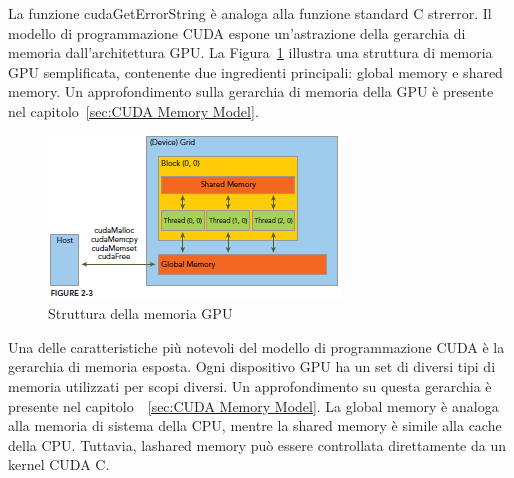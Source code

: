 La funzione cudaGetErrorString è analoga alla funzione standard C strerror.
Il modello di programmazione CUDA espone un'astrazione della gerarchia di memoria dall'architettura GPU. La Figura~\ref{fig:GPU_Memory_Structure} illustra una struttura di memoria GPU semplificata, contenente due ingredienti principali: global memory e shared memory. Un approfondimento sulla gerarchia di memoria della GPU è presente nel capitolo~\ref{sec:CUDA Memory Model}.
\begin{figure}[h!]
	\centering
	\includegraphics[width=.85\textwidth]{Immagini/CUDA/GPU_Memory_Structure}
	\caption{Struttura della memoria GPU \cite{Cheng:ProfessionalCudaProgramming}}
	\label{fig:GPU_Memory_Structure}
\end{figure}
Una delle caratteristiche più notevoli del modello di programmazione CUDA è la gerarchia di memoria esposta. Ogni dispositivo GPU ha un set di diversi tipi di memoria utilizzati per scopi diversi. Un approfondimento su questa gerarchia è presente nel capitolo~~\ref{sec:CUDA Memory Model}. La global memory è analoga alla memoria di sistema della CPU, mentre la shared memory è simile alla cache della CPU. Tuttavia, lashared memory può essere controllata direttamente da un kernel CUDA C.

